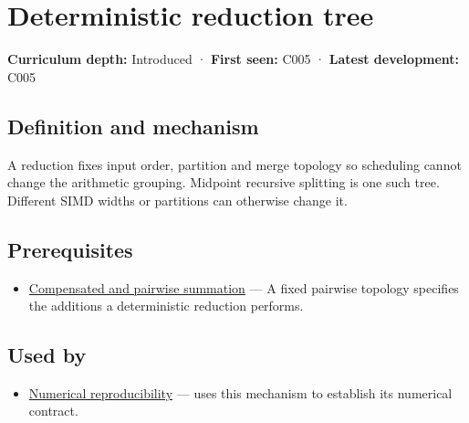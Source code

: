 \hypertarget{appendix-4c8e0238e7ee}{}\label{referencestart:appendix-4c8e0238e7ee}
\section{Deterministic reduction tree}\label{appendix-4c8e0238e7ee-deterministic-reduction-tree}

\hypertarget{appendix-4c8e0238e7ee-deterministic-reduction-tree}{}

\textbf{Curriculum depth:} Introduced · \textbf{First seen:} C005 · \textbf{Latest development:} C005

\begin{allmightroledefinition}

\subsection{Definition and mechanism}\label{appendix-4c8e0238e7ee-definition-and-mechanism}

\hypertarget{appendix-4c8e0238e7ee-definition-and-mechanism}{}

A reduction fixes input order, partition and merge topology so scheduling cannot change the arithmetic grouping. Midpoint recursive splitting is one such tree. Different SIMD widths or partitions can otherwise change it.

\end{allmightroledefinition}

\subsection{Prerequisites}\label{appendix-4c8e0238e7ee-prerequisites}

\hypertarget{appendix-4c8e0238e7ee-prerequisites}{}

\begin{itemize}
\tightlist
\item
  \hyperref[appendix-df318da57389]{Compensated and pairwise summation} --- A fixed pairwise topology specifies the additions a deterministic reduction performs.
\end{itemize}

\subsection{Used by}\label{appendix-4c8e0238e7ee-used-by}

\hypertarget{appendix-4c8e0238e7ee-used-by}{}

\begin{itemize}
\tightlist
\item
  \hyperref[appendix-5f1a2c3f97ff]{Numerical reproducibility} --- uses this mechanism to establish its numerical contract.
\end{itemize}

